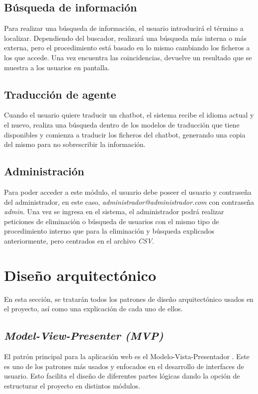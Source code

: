 \subsection{Búsqueda de información}
Para realizar una búsqueda de información, el usuario introducirá el término a localizar. Dependiendo del buscador, realizará una búsqueda más interna o más externa, pero el procedimiento está basado en lo mismo cambiando los ficheros a los que accede. Una vez encuentra las coincidencias, devuelve un resultado que se muestra a los usuarios en pantalla.

\subsection{Traducción de agente}
Cuando el usuario quiere traducir un chatbot, el sistema recibe el idioma actual y el nuevo, realiza una búsqueda dentro de los modelos de traducción que tiene disponibles y comienza a traducir los ficheros del chatbot, generando una copia del mismo para no sobrescribir la información.

\subsection{Administración}
Para poder acceder a este módulo, el usuario debe poseer el usuario y contraseña del administrador, en este caso, \textit{administrador@administrador.com} con contraseña \textit{admin}. Una vez se ingresa en el sistema, el administrador podrá realizar peticiones de eliminación o búsqueda de usuarios con el mismo tipo de procedimiento interno que para la eliminación y búsqueda explicados anteriormente, pero centrados en el archivo \textit{CSV}.

\section{Diseño arquitectónico}
En esta sección, se tratarán todos los patrones de diseño arquitectónico usados en el proyecto, así como una explicación de cada uno de ellos.

\subsection{\textit{Model-View-Presenter (MVP)}}
El patrón principal para la aplicación web es el Modelo-Vista-Presentador \cite{mvp:online}. Este es uno de los patrones más usados y enfocados en el desarrollo de interfaces de usuario. Esto facilita el diseño de diferentes partes lógicas dando la opción de estructurar el proyecto en distintos módulos.

